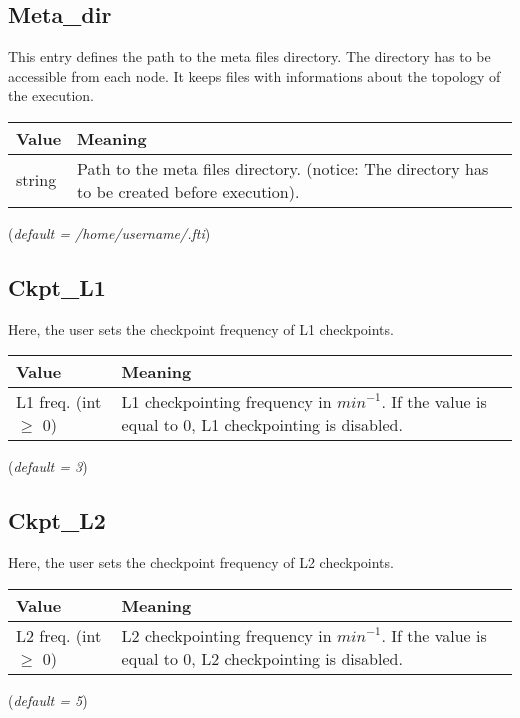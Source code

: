 \documentclass{refrep}
\begin{document}
\subsection{Meta\_dir}\label{subsec:metadir}
This entry defines the path to the meta files directory. The directory has to be accessible from each node. It keeps files with informations about the topology of the execution.
\begin{center}
\begin{tabular}[h!]{|p{}|p{}|}
\hline
\textbf{Value} & \textbf{Meaning} \\ \hline
string & Path to the meta files directory. (notice: The directory has to be created before execution). \\ \hline
\end{tabular}
\end{center}
(\textit{default = /home/username/.fti})
\subsection{Ckpt\_L1}\label{subsec:ckptl1}
Here, the user sets the checkpoint frequency of L1 checkpoints.
\begin{center}
\begin{tabular}[h!]{|p{}|p{}|}
\hline
\textbf{Value} & \textbf{Meaning} \\ \hline
L1 freq. (int $\geq$ 0)  & L1 checkpointing frequency in $\textit{min}^{-1}$. If the value is equal to 0, L1 checkpointing is disabled.  \\ \hline
\end{tabular}
\end{center}
(\textit{default = 3})
\subsection{Ckpt\_L2}\label{subsec:ckptl2}
Here, the user sets the checkpoint frequency of L2 checkpoints.
\begin{center}
\begin{tabular}[h!]{|p{}|p{}|}
\hline
\textbf{Value} & \textbf{Meaning} \\ \hline
L2 freq. (int $\geq$ 0)  & L2 checkpointing frequency in $\textit{min}^{-1}$. If the value is equal to 0, L2 checkpointing is disabled.  \\ \hline
\end{tabular}
\end{center}
(\textit{default = 5})
\end{document}
